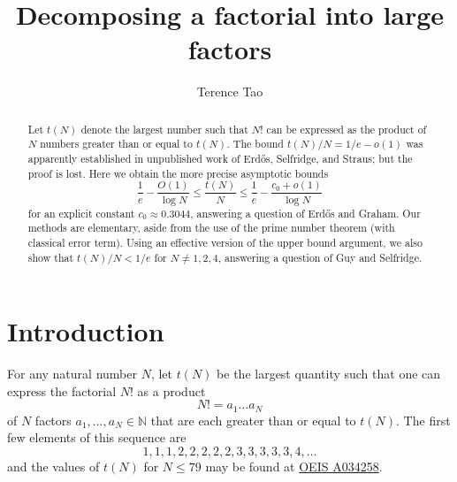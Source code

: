 \documentclass[12pt,a4paper,reqno]{amsart}
\numberwithin{equation}{section}
\theoremstyle{plain}
\theoremstyle{definition}
\newcommand\N{\mathbb{N}}
\begin{document}
\title{Decomposing a factorial into large factors}

\author{Terence Tao}
\address{UCLA Department of Mathematics, Los Angeles, CA 90095-1555.}



\begin{abstract}  Let $t(N)$ denote the largest number such that $N!$ can be expressed as the product of $N$ numbers greater than or equal to $t(N)$.
The bound $t(N)/N = 1/e-o(1)$ was apparently established in unpublished work of Erd\H{o}s, Selfridge, and Straus; but the proof is lost.  Here we obtain the more precise asymptotic bounds
$$ \frac{1}{e} - \frac{O(1)}{\log N} \leq \frac{t(N)}{N} \leq \frac{1}{e} - \frac{c_0+o(1)}{\log N}$$
for an explicit constant $c_0 \approx 0.3044$, answering a question of Erd\H{o}s and Graham.  Our methods are elementary, aside from the use of the prime number theorem (with classical error term).  Using an effective version of the upper bound argument, we also show that $t(N)/N < 1/e$ for $N \neq 1,2,4$, answering a question of Guy and Selfridge.
\end{abstract}

\maketitle


\section{Introduction}

For any natural number $N$, let $t(N)$ be the largest quantity such that one can express the factorial $N!$ as a product
\begin{equation}\label{an}
 N! = a_1 \dots a_N
\end{equation}
of $N$ factors $a_1,\dots,a_N \in \N$ that are each greater than or equal to $t(N)$. The first few elements of this sequence are
$$ 1,1,1,2,2,2,2,2,3,3,3,3,3,4, \dots$$
and the values of $t(N)$ for $N \leq 79$ may be found at \href{https://oeis.org/A034258}{OEIS A034258}. 
\end{document}
